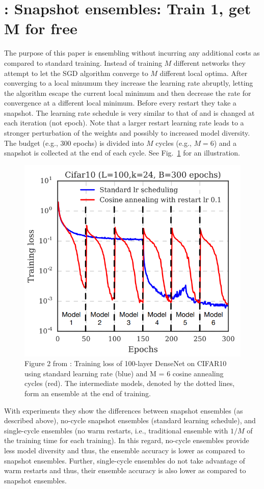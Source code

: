 \section{\textcite{huang2017snapshot}: Snapshot ensembles: Train 1, get M for free}
The purpose of this paper is ensembling without incurring any additional costs as compared to standard training.
Instead of training $M$ different networks they attempt to let the SGD algorithm converge to $M$ different local optima. 
After converging to a local minumum they increase the learning rate abruptly, letting the algorithm escape the current local minimum and then decrease the rate for convergence at a different local minimum.
Before every restart they take a snapshot. 
The learning rate schedule is very similar to that of \textcite{loshchilov2016sgdr} and is changed at each iteration (not epoch). 
Note that a larger restart learning rate leads to a stronger perturbation of the weights and possibly to increased model diversity.
The budget (e.g., $300$ epochs) is divided into $M$ cycles (e.g., $M=6$) and a snapshot is collected at the end of each cycle.
See Fig.~\ref{huangschedule} for an illustration.
\begin{figure}[H]
	\centering
	\includegraphics[width=0.5\linewidth]{./Figures/huangschedule.png}
	\caption{Figure 2 from \textcite{huang2017snapshot}: Training loss of 100-layer DenseNet on CIFAR10 using standard learning rate (blue) and M = 6
		cosine annealing cycles (red). The intermediate models, denoted by the dotted lines, form an ensemble at
		the end of training.}
	\label{huangschedule}
\end{figure}

With experiments they show the differences between snapshot ensembles (as described above), no-cycle snapshot ensembles (standard learning schedule), and single-cycle ensembles (no warm restarts, i.e., traditional ensemble with $1/M$ of the training time for each training).
In this regard, no-cycle ensembles provide less model diversity and thus, the ensemble accuracy is lower as compared to snapshot ensembles.
Further, single-cycle ensembles do not take advantage of warm restarts and thus, their ensemble accuracy is also lower as compared to snapshot ensembles.

